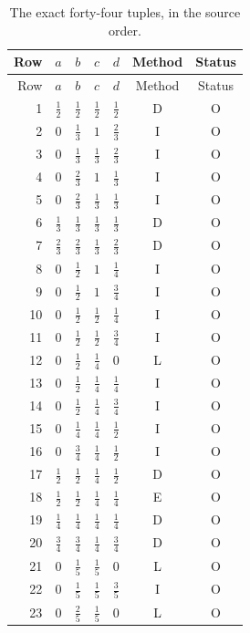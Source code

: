 \documentclass[11pt,a4paper]{article}
\theoremstyle{definition}
\theoremstyle{remark}
\numberwithin{equation}{section}
\begin{document}
{\small
\begin{longtable}{@{}rcccccc@{}}
\caption{The exact forty-four tuples, in the source order.}\label{dbkz-tab:44}\\
\toprule Row&$a$&$b$&$c$&$d$&Method&Status\\\midrule\endfirsthead
\toprule Row&$a$&$b$&$c$&$d$&Method&Status\\\midrule\endhead
1&$\tfrac{1}{2}$&$\tfrac{1}{2}$&$\tfrac{1}{2}$&$\tfrac{1}{2}$&D&O\\
2&$0$&$\tfrac{1}{3}$&$1$&$\tfrac{2}{3}$&I&O\\
3&$0$&$\tfrac{1}{3}$&$\tfrac{1}{3}$&$\tfrac{2}{3}$&I&O\\
4&$0$&$\tfrac{2}{3}$&$1$&$\tfrac{1}{3}$&I&O\\
5&$0$&$\tfrac{2}{3}$&$\tfrac{1}{3}$&$\tfrac{1}{3}$&I&O\\
6&$\tfrac{1}{3}$&$\tfrac{1}{3}$&$\tfrac{1}{3}$&$\tfrac{1}{3}$&D&O\\
7&$\tfrac{2}{3}$&$\tfrac{2}{3}$&$\tfrac{1}{3}$&$\tfrac{2}{3}$&D&O\\
8&$0$&$\tfrac{1}{2}$&$1$&$\tfrac{1}{4}$&I&O\\
9&$0$&$\tfrac{1}{2}$&$1$&$\tfrac{3}{4}$&I&O\\
10&$0$&$\tfrac{1}{2}$&$\tfrac{1}{2}$&$\tfrac{1}{4}$&I&O\\
11&$0$&$\tfrac{1}{2}$&$\tfrac{1}{2}$&$\tfrac{3}{4}$&I&O\\
12&$0$&$\tfrac{1}{2}$&$\tfrac{1}{4}$&$0$&L&O\\
13&$0$&$\tfrac{1}{2}$&$\tfrac{1}{4}$&$\tfrac{1}{4}$&I&O\\
14&$0$&$\tfrac{1}{2}$&$\tfrac{1}{4}$&$\tfrac{3}{4}$&I&O\\
15&$0$&$\tfrac{1}{4}$&$\tfrac{1}{4}$&$\tfrac{1}{2}$&I&O\\
16&$0$&$\tfrac{3}{4}$&$\tfrac{1}{4}$&$\tfrac{1}{2}$&I&O\\
17&$\tfrac{1}{2}$&$\tfrac{1}{2}$&$\tfrac{1}{4}$&$\tfrac{1}{2}$&D&O\\
18&$\tfrac{1}{2}$&$\tfrac{1}{2}$&$\tfrac{1}{4}$&$\tfrac{1}{4}$&E&O\\
19&$\tfrac{1}{4}$&$\tfrac{1}{4}$&$\tfrac{1}{4}$&$\tfrac{1}{4}$&D&O\\
20&$\tfrac{3}{4}$&$\tfrac{3}{4}$&$\tfrac{1}{4}$&$\tfrac{3}{4}$&D&O\\
21&$0$&$\tfrac{1}{5}$&$\tfrac{1}{5}$&$0$&L&O\\
22&$0$&$\tfrac{1}{5}$&$\tfrac{1}{5}$&$\tfrac{3}{5}$&I&O\\
23&$0$&$\tfrac{2}{5}$&$\tfrac{1}{5}$&$0$&L&O\\

\end{longtable}}
\end{document}
